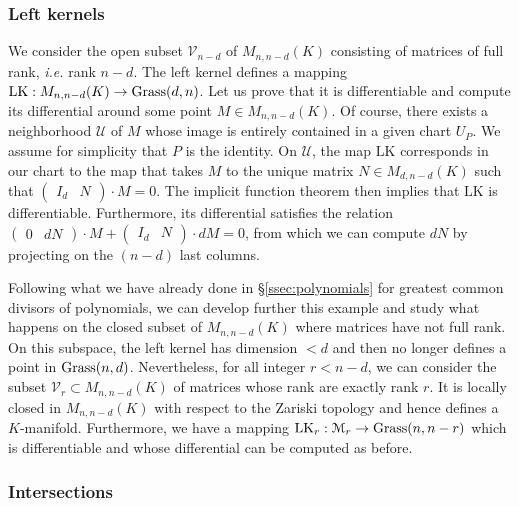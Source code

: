 \documentclass{lms}
\begin{document}
\subsubsection*{Left kernels}

We consider the open subset $\mathcal V_{n-d}$ of $M_{n,n-d}(K)$ 
consisting of matrices of full rank, \emph{i.e.} rank $n-d$. The left 
kernel defines a mapping $\text{LK} : M_{n,n-d}(K) \to \text{\rm Grass}(d,n)$. Let 
us prove that it is differentiable and compute its differential around 
some point $M \in M_{n,n-d}(K)$. Of course, there exists a neighborhood 
$\mathcal U$ of $M$ whose image is entirely contained in a given chart 
$U_P$. We assume for simplicity that $P$ is the identity. On $\mathcal 
U$, the map $\text{LK}$ corresponds in our chart to the map that 
takes $M$ to the unique matrix $N \in M_{d, n-d}(K)$ such that 
$\begin{pmatrix} I_d & N \end{pmatrix} \cdot M = 0$. The implicit 
function theorem then implies that $\text{LK}$ is differentiable. 
Furthermore, its differential satisfies the relation
$\begin{pmatrix} 0 & dN \end{pmatrix} \cdot M +
\begin{pmatrix} I_d & N \end{pmatrix} \cdot dM = 0$,
from which we can compute $dN$ by projecting on the $(n-d)$ last
columns.

Following what we have already done in \S \ref{ssec:polynomials} for 
greatest common divisors of polynomials, we can develop further this 
example and study what happens on the closed subset of $M_{n,n-d}(K)$ 
where matrices have not full rank. On this subspace, the left kernel has 
dimension $< d$ and then no longer defines a point in $\text{\rm Grass}(n,d)$. 
Nevertheless, for all integer $r < n-d$, we can consider the subset 
$\mathcal V_r \subset M_{n,n-d}(K)$ of matrices whose rank are exactly 
rank $r$. It is locally closed in $M_{n,n-d}(K)$ with respect to the 
Zariski topology and hence defines a $K$-manifold. Furthermore, we have a 
mapping $\text{LK}_r : \mathcal M_r \to \Grass(n,n-r)$ which is 
differentiable and whose differential can be computed as before.

\subsubsection*{Intersections}
\end{document}
